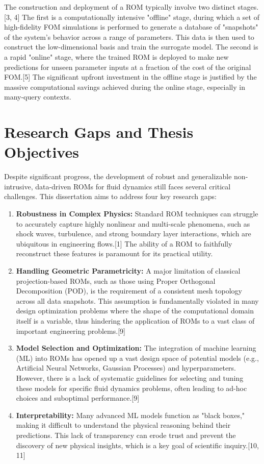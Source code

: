 \documentclass[12pt, a4paper]{report}
\begin{document}
The construction and deployment of a ROM typically involve two distinct stages.[3, 4] The first is a computationally intensive "offline" stage, during which a set of high-fidelity FOM simulations is performed to generate a database of "snapshots" of the system's behavior across a range of parameters. This data is then used to construct the low-dimensional basis and train the surrogate model. The second is a rapid "online" stage, where the trained ROM is deployed to make new predictions for unseen parameter inputs at a fraction of the cost of the original FOM.[5] The significant upfront investment in the offline stage is justified by the massive computational savings achieved during the online stage, especially in many-query contexts.

\section{Research Gaps and Thesis Objectives}
Despite significant progress, the development of robust and generalizable non-intrusive, data-driven ROMs for fluid dynamics still faces several critical challenges. This dissertation aims to address four key research gaps:
\begin{enumerate}
    \item \textbf{Robustness in Complex Physics:} Standard ROM techniques can struggle to accurately capture highly nonlinear and multi-scale phenomena, such as shock waves, turbulence, and strong boundary layer interactions, which are ubiquitous in engineering flows.[1] The ability of a ROM to faithfully reconstruct these features is paramount for its practical utility.
    \item \textbf{Handling Geometric Parametricity:} A major limitation of classical projection-based ROMs, such as those using Proper Orthogonal Decomposition (POD), is the requirement of a consistent mesh topology across all data snapshots. This assumption is fundamentally violated in many design optimization problems where the shape of the computational domain itself is a variable, thus hindering the application of ROMs to a vast class of important engineering problems.[9]
    \item \textbf{Model Selection and Optimization:} The integration of machine learning (ML) into ROMs has opened up a vast design space of potential models (e.g., Artificial Neural Networks, Gaussian Processes) and hyperparameters. However, there is a lack of systematic guidelines for selecting and tuning these models for specific fluid dynamics problems, often leading to ad-hoc choices and suboptimal performance.[9]
    \item \textbf{Interpretability:} Many advanced ML models function as "black boxes," making it difficult to understand the physical reasoning behind their predictions. This lack of transparency can erode trust and prevent the discovery of new physical insights, which is a key goal of scientific inquiry.[10, 11]
\end{enumerate}
\end{document}
